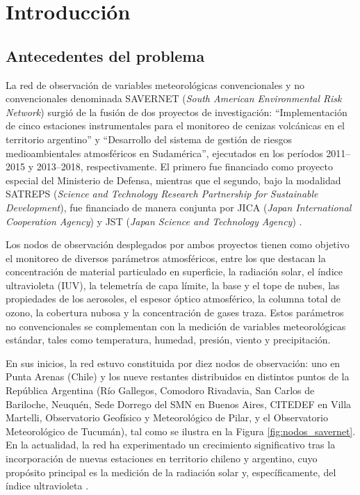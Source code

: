 \chapter{Introducción}
\label{cap:introduccion}

\section{Antecedentes del problema}
\label{sec:antecedentes}

La red de observación de variables meteorológicas convencionales y no convencionales denominada SAVERNET (\emph{South American Environmental Risk Network}) surgió de la fusión de dos proyectos de investigación: ``Implementación de cinco estaciones instrumentales para el monitoreo de cenizas volcánicas en el territorio argentino'' y ``Desarrollo del sistema de gestión de riesgos medioambientales atmosféricos en Sudamérica'', ejecutados en los períodos 2011--2015 y 2013--2018, respectivamente. El primero fue financiado como proyecto especial del Ministerio de Defensa, mientras que el segundo, bajo la modalidad SATREPS (\textit{Science and Technology Research Partnership for Sustainable Development}), fue financiado de manera conjunta por JICA (\textit{Japan International Cooperation Agency}) y JST (\textit{Japan Science and Technology Agency}) \cite{notasmn202070}.

Los nodos de observación desplegados por ambos proyectos tienen como objetivo el monitoreo de diversos parámetros atmosféricos, entre los que destacan la concentración de material particulado en superficie, la radiación solar, el índice ultravioleta (IUV), la telemetría de capa límite, la base y el tope de nubes, las propiedades de los aerosoles, el espesor óptico atmosférico, la columna total de ozono, la cobertura nubosa y la concentración de gases traza. Estos parámetros no convencionales se complementan con la medición de variables meteorológicas estándar, tales como temperatura, humedad, presión, viento y precipitación.

En sus inicios, la red estuvo constituida por diez nodos de observación: uno en Punta Arenas (Chile) y los nueve restantes distribuidos en distintos puntos de la República Argentina (Río Gallegos, Comodoro Rivadavia, San Carlos de Bariloche, Neuquén, Sede Dorrego del SMN en Buenos Aires, CITEDEF en Villa Martelli, Observatorio Geofísico y Meteorológico de Pilar, y el Observatorio Meteorológico de Tucumán), tal como se ilustra en la Figura \ref{fig:nodos_savernet}. En la actualidad, la red ha experimentado un crecimiento significativo tras la incorporación de nuevas estaciones en territorio chileno y argentino, cuyo propósito principal es la medición de la radiación solar y, específicamente, del índice ultravioleta \cite{sitiosaver}.


